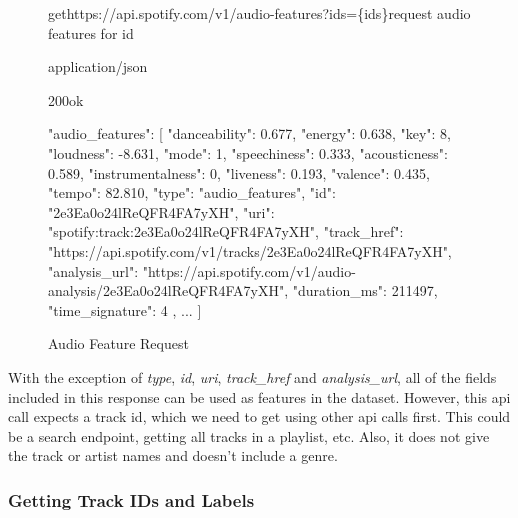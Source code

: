 \begin{figure}[H]
    \caption{Audio Feature Request}
	\label{fig:Audio Feature Request}
\begin{apiRoute}{get}{https://api.spotify.com/v1/audio-features?ids=\{ids\}}{request audio features for id}
    \methodJson
    \begin{routeParameter}
    \end{routeParameter}
    \begin{routeResponse}{application/json}
        \begin{routeResponseItem}{200}{ok}
            \begin{routeResponseItemBody}
{
    "audio_features": [
        {
            "danceability": 0.677,
            "energy": 0.638,
            "key": 8,
            "loudness": -8.631,
            "mode": 1,
            "speechiness": 0.333,
            "acousticness": 0.589,
            "instrumentalness": 0,
            "liveness": 0.193,
            "valence": 0.435,
            "tempo": 82.810,
            "type": "audio_features",
            "id": "2e3Ea0o24lReQFR4FA7yXH",
            "uri": "spotify:track:2e3Ea0o24lReQFR4FA7yXH",
            "track_href": "https://api.spotify.com/v1/tracks/2e3Ea0o24lReQFR4FA7yXH",
            "analysis_url": "https://api.spotify.com/v1/audio-analysis/2e3Ea0o24lReQFR4FA7yXH",
            "duration_ms": 211497,
            "time_signature": 4
        },
        ...
    ]
}
            \end{routeResponseItemBody}
        \end{routeResponseItem}
    \end{routeResponse}
\end{apiRoute}
\end{figure}

With the exception of \emph{type}, \emph{id}, \emph{uri}, \emph{track\_href} and \emph{analysis\_url}, all of the fields included in this response
can be used as features in the dataset. However, this api call expects a track id, which we need to get using
other api calls first. This could be a search endpoint, getting all tracks in a playlist, etc.
Also, it does not give the track or artist names and doesn't include a genre.

\subsubsection{Getting Track IDs and Labels}

